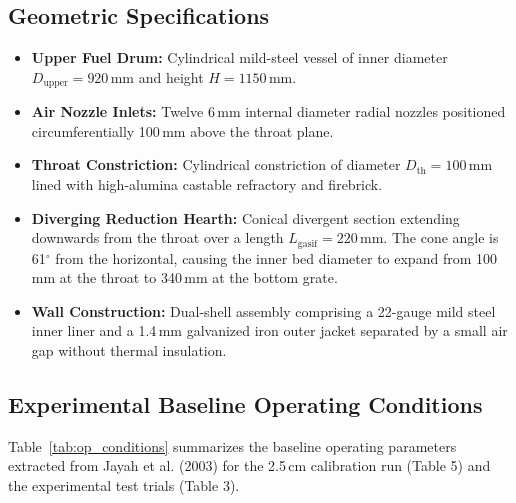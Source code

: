 \documentclass[11pt,a4paper]{article}
\begin{document}
\subsection{Geometric Specifications}
\begin{itemize}[leftmargin=1.5em]
    \item \textbf{Upper Fuel Drum:} Cylindrical mild-steel vessel of inner diameter $D_{\text{upper}} = 920$\,mm and height $H = 1150$\,mm.
    \item \textbf{Air Nozzle Inlets:} Twelve 6\,mm internal diameter radial nozzles positioned circumferentially 100\,mm above the throat plane.
    \item \textbf{Throat Constriction:} Cylindrical constriction of diameter $D_{\text{th}} = 100$\,mm lined with high-alumina castable refractory and firebrick.
    \item \textbf{Diverging Reduction Hearth:} Conical divergent section extending downwards from the throat over a length $L_{\text{gasif}} = 220$\,mm. The cone angle is 61$^\circ$ from the horizontal, causing the inner bed diameter to expand from 100\,mm at the throat to 340\,mm at the bottom grate.
    \item \textbf{Wall Construction:} Dual-shell assembly comprising a 22-gauge mild steel inner liner and a 1.4\,mm galvanized iron outer jacket separated by a small air gap without thermal insulation.
\end{itemize}

\subsection{Experimental Baseline Operating Conditions}
Table~\ref{tab:op_conditions} summarizes the baseline operating parameters extracted from Jayah et al. (2003) for the 2.5\,cm calibration run (Table 5) and the experimental test trials (Table 3).
\end{document}

